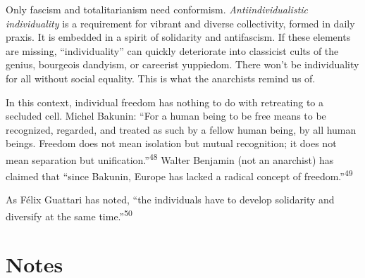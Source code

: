 Only fascism and totalitarianism need conformism. \textit{Antiindividualistic
individuality} is a requirement for vibrant and diverse collectivity, formed in
daily praxis. It is embedded in a spirit of solidarity and antifascism. If these
elements are missing, “individuality” can quickly deteriorate into classicist
cults of the genius, bourgeois dandyism, or careerist yuppiedom. There won’t be
individuality for all without social equality. This is what the anarchists
remind us of.

In this context, individual freedom has nothing to do with retreating to a
secluded cell. Michel Bakunin: “For a human being to be free means to be
recognized, regarded, and treated as such by a fellow human being, by all human
beings. Freedom does not mean isolation but mutual recognition; it does not mean
separation but unification.”\textsuperscript{48} Walter Benjamin (not an
anarchist) has claimed that “since Bakunin, Europe has lacked a radical concept
of freedom.”\textsuperscript{49}

As Félix Guattari has noted, “the individuals have to develop solidarity and
diversify at the same time.”\textsuperscript{50}

\clearpage

\vspace*{2.5cm}
\section*{Notes}
\vspace*{4cm}

